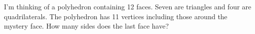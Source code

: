 \documentclass{book}
\begin{document}
\setcounter{cpjt}{33}
\addtocounter{cpjt}{-1}
\begin{activity}\label{activity-28}
\hypertarget{p-306}{}%
I'm thinking of a polyhedron containing 12 faces. Seven are triangles and four are quadrilaterals. The polyhedron has 11 vertices including those around the mystery face. How many sides does the last face have?%
\par\smallskip%
\noindent\end{activity}

\clearpage
\end{document}
